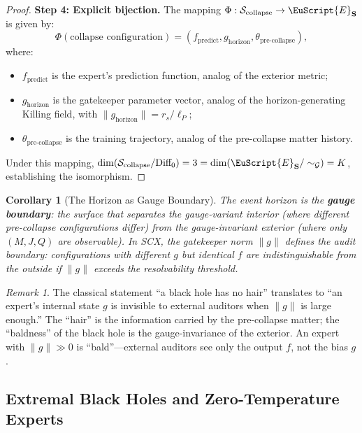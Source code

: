 \documentclass[12pt,a4paper]{article}
\newtheorem{corollary}[theorem]{Corollary}
\theoremstyle{remark}
\newtheorem{remark}[theorem]{Remark}
\newcommand{\G}{\mathcal{G}}
\newcommand{\Sg}{\mathcal{S}}
\newcommand{\ExpertSet}{\EuScript{E}}
\newcommand{\SCX}{\textsf{SCX}}
\begin{document}
\begin{proof}
\smallskip
\noindent\textbf{Step 4: Explicit bijection.}
The mapping $\Phi: \Sg_{\text{collapse}} \to \ExpertSet_{\mathbf{S}}$ is given by:
\begin{equation}
  \Phi(\text{collapse configuration}) = (f_{\text{predict}}, g_{\text{horizon}}, \theta_{\text{pre-collapse}}),
\end{equation}
where:
\begin{itemize}[leftmargin=*]
  \item $f_{\text{predict}}$ is the expert's prediction function, analog of the exterior metric;
  \item $g_{\text{horizon}}$ is the gatekeeper parameter vector, analog of the horizon-generating Killing field, with $\|g_{\text{horizon}}\| = r_s / \ell_P$;
  \item $\theta_{\text{pre-collapse}}$ is the training trajectory, analog of the pre-collapse matter history.
\end{itemize}
Under this mapping, $\dim(\Sg_{\text{collapse}} / \text{Diff}_0) = 3 = \dim(\ExpertSet_{\mathbf{S}} / \sim_{\G}) = K$, establishing the isomorphism.
\end{proof}

\begin{corollary}[The Horizon as Gauge Boundary]
\label{cor:horizon_gauge}
The event horizon is the \textbf{gauge boundary}: the surface that separates the gauge-variant interior (where different pre-collapse configurations differ) from the gauge-invariant exterior (where only $(M, J, Q)$ are observable). In \SCX{}, the gatekeeper norm $\|g\|$ defines the audit boundary: configurations with different $g$ but identical $f$ are indistinguishable from the outside if $\|g\|$ exceeds the resolvability threshold.
\end{corollary}

\begin{remark}
\label{rem:nohair_analogy}
The classical statement ``a black hole has no hair'' translates to ``an expert's internal state $g$ is invisible to external auditors when $\|g\|$ is large enough.'' The ``hair'' is the information carried by the pre-collapse matter; the ``baldness'' of the black hole is the gauge-invariance of the exterior. An expert with $\|g\| \gg 0$ is ``bald''---external auditors see only the output $f$, not the bias $g$.
\end{remark}

\subsection{Extremal Black Holes and Zero-Temperature Experts}
\end{document}
